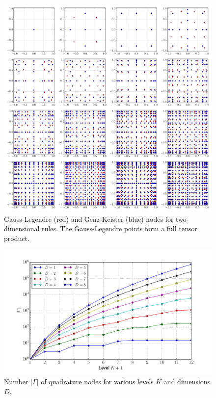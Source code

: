 \documentclass[a4paper,10pt]{article}
\begin{document}
\begin{figure}[h]
  \centering
  \includegraphics[width=\linewidth]{./img/gk_legendre_nodes_2d.pdf}
  \caption{Gauss-Legendre (red) and Genz-Keister (blue) nodes for
  two-dimensional rules. The Gauss-Legendre points form a full tensor
  product.}
  \label{fig:gk_legendre_nodes_2d}
\end{figure}

\begin{figure}
  \centering
  \includegraphics[width=\linewidth]{./img/number_nodes_levdim_legendre.pdf}
  \caption{Number $|\Gamma|$ of quadrature nodes for various levels $K$ and dimensions $D$.}
  \label{fig:number_nodes_levdim_legendre}
\end{figure}
\end{document}
